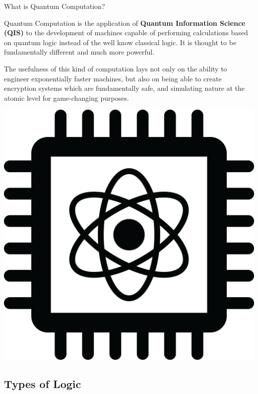 \documentclass[9pt, handout, aspectratio=169]{beamer}		%
\begin{document}
	\begin{frame}{What is Quantum Computation?}

		Quantum Computation is the application of \textbf{Quantum Information Science (QIS)} to the development of machines capable of performing calculations based on quantum logic instead of the well know classical logic. It is thought to be fundamentally different and much more powerful.

		\begin{multicols}{2}

		The usefulness of this kind of computation lays not only on the ability to engineer exponentially faster machines, but also on being able to create encryption systems which are fundamentally safe, and simulating nature at the atomic level for game-changing purposes.

			\begin{center}
		\includegraphics[width=.30\paperwidth]{Figures/Quantum_Chip}
			\end{center}

		\end{multicols}

	\end{frame}


	\subsection{Types of Logic}
\end{document}
